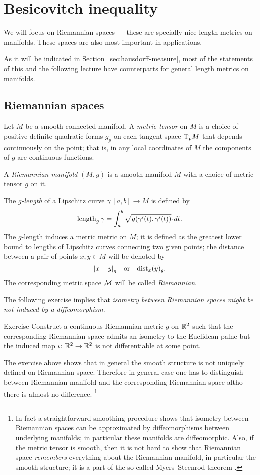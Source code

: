 \chapter{Besicovitch inequality} 

We will focus on Riemannian spaces --- these are specially nice length metrics on manifolds.
These spaces are also most important in applications.

As it will be indicated in Section~\ref{sec:hausdorff-measure},
most of the statements of this and the following lecture have counterparts for general length metrics on manifolds.

\section{Riemannian spaces}

Let $M$ be a smooth connected manifold.
A \emph{metric tensor} on $M$ is a choice of positive definite quadratic forms $g_p$ on each tangent space $\mathrm{T}_pM$ that depends continuously on the point;
that is, in any local coordinates of $M$ the components of $g$ are continuous functions.

A \emph{Riemannian manifold} $(M,g)$ is a smooth manifold $M$ with a choice of metric tensor $g$ on it.

The \emph{$g$-length} of a Lipschitz curve $\gamma\:[a,b]\to M$  is defined by
\[\length_g\gamma=\int_a^b\sqrt{g(\gamma'(t),\gamma'(t))}\cdot dt.\]
The $g$-length induces a metric metric on $M$; it is defined as the greatest lower bound to lengths of Lipschitz curves connecting two given points;
the distance between a pair of points $x,y\in M$ will be denoted by 
\[\dist{x}{y}{g}\quad\text{or}\quad\distfun_x(y)_g.\]
The corresponding metric space $\mathcal{M}$ will be called \emph{Riemannian}.

The following exercise implies that \textit{isometry between Riemannian spaces might be not induced by a diffeomorphism}.

\begin{thm}{Exercise}\label{ex:non-differentiable}
Construct a continuous Riemannian metric $g$ on $\mathbb{R}^2$ such that the corresponding Riemannian space admits an isometry to the Euclidean palne but the induced map $\iota\colon\mathbb{R}^2\to\mathbb{R}^2$ is not differentiable at some point.
\end{thm}

The exercise above shows that in general the smooth structure is not uniquely defined on Riemannian space.
Therefore in general case one has to distinguish between Riemannian manifold and the corresponding Riemannian space altho there is almost no difference.%
\footnote{In fact a straightforward smoothing procedure shows that isometry between Riemannian spaces can be approximated by diffeomorphisms between underlying manifolds; in particular these manifolds are diffeomorphic.
Also, if the metric tensor is smooth, then it is not hard to show that Riemannian space {}\emph{remembers} everything about the Riemannian manifold, in particular the smooth structure;
it is a part of the so-called Myers--Steenrod theorem \cite{myers-steenrod}.} 

